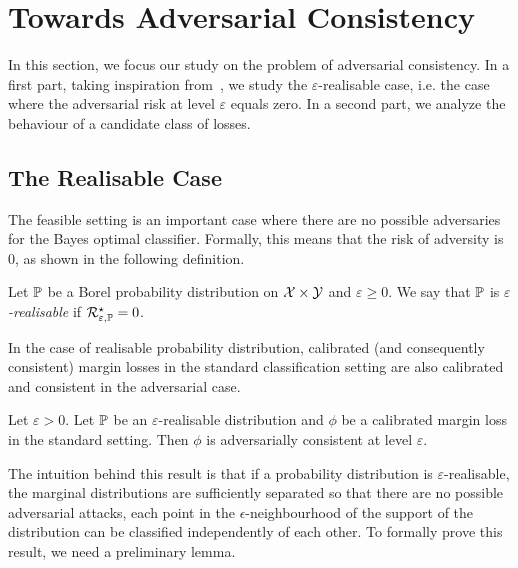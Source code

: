 \section{Towards Adversarial Consistency}
\label{sec:consistency}
In this section, we focus our study on the problem of adversarial consistency. In a first part, taking inspiration from~\citet{long2013consistency,awasthi2021calibration}, we study the $\varepsilon$-realisable case, i.e. the case where the adversarial risk at level $\varepsilon$ equals zero. In a second part, we analyze the behaviour of a candidate class of losses.



\subsection{The Realisable Case}
The feasible setting is an important case where there are no possible adversaries for the Bayes optimal classifier. Formally, this means that the risk of adversity is $0$, as shown in the following definition.

\begin{definition}
Let $\mathbb{P}$ be a Borel probability distribution on $\mathcal{X}\times\mathcal{Y}$ and $\varepsilon\geq0$. We say that $\mathbb{P}$ is \emph{$\varepsilon$-realisable} if $\mathcal{R}_{\varepsilon,\mathbb{P}}^\star = 0$.
\end{definition}


In the case of realisable probability distribution, calibrated (and consequently consistent) margin losses in the standard classification setting are also calibrated and consistent in the adversarial case. 
\begin{prop}
\label{prop:realizable} 
Let $\varepsilon>0$. Let $\mathbb{P}$ be an $\varepsilon$-realisable distribution and $\phi$ be a calibrated margin loss in the standard setting. Then $\phi$ is adversarially consistent at level $\varepsilon$. 
\end{prop}
The intuition behind this result is that if a probability distribution is $\varepsilon$-realisable, the marginal distributions are sufficiently separated so that there are no possible adversarial attacks, each point in the $\epsilon$-neighbourhood of the support of the distribution can be classified independently of each other. To formally prove this result, we need a preliminary lemma.


